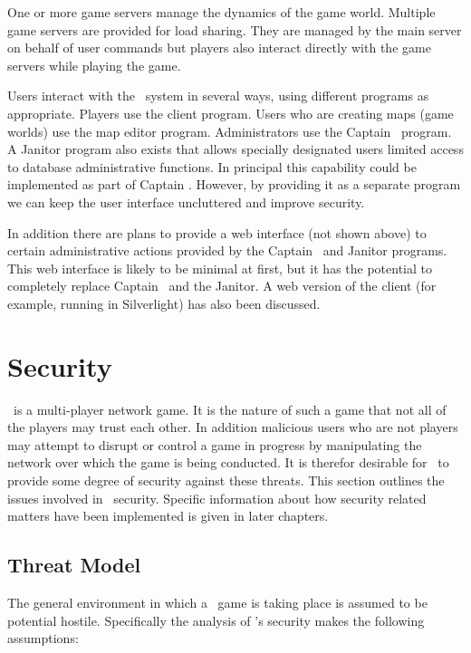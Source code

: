 One or more game servers manage the dynamics of the game world. Multiple game servers are provided for load sharing. They are managed by the main server on behalf of user commands but players also interact directly with the game servers while playing the game.

Users interact with the \VTank\ system in several ways, using different programs as appropriate. Players use the client program. Users who are creating maps (game worlds) use the map editor program. Administrators use the Captain \VTank\ program. A Janitor program also exists that allows specially designated users limited access to database administrative functions. In principal this capability could be implemented as part of Captain \VTank. However, by providing it as a separate program we can keep the user interface uncluttered and improve security.

In addition there are plans to provide a web interface (not shown above) to certain administrative actions provided by the Captain \VTank\ and Janitor programs. This web interface is likely to be minimal at first, but it has the potential to completely replace Captain \VTank\ and the Janitor. A web version of the client (for example, running in Silverlight) has also been discussed.

\section{Security}

\VTank\ is a multi-player network game. It is the nature of such a game that not all of the players may trust each other. In addition malicious users who are not players may attempt to disrupt or control a game in progress by manipulating the network over which the game is being conducted. It is therefor desirable for \VTank\ to provide some degree of security against these threats. This section outlines the issues involved in \VTank\ security. Specific information about how security related matters have been implemented is given in later chapters.

\subsection{Threat Model}

The general environment in which a \VTank\ game is taking place is assumed to be potential hostile. Specifically the analysis of \VTank's security makes the following assumptions:

